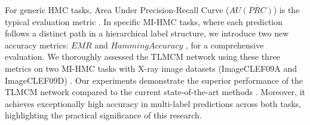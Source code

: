 \documentclass[wcp]{jmlr}
\begin{document}

For generic HMC tasks, Area Under Precision-Recall Curve ($AU\overline{(PRC)}$) is the typical evaluation metric \cite{Giunchiglia01,Wehrmann01}. In specific MI-HMC tasks, where each prediction follows a distinct path in a hierarchical label structure, we introduce two new accuracy metrics: $EMR$ and $HammingAccuracy$ \cite{Sorower01}, for a comprehensive evaluation. We thoroughly assessed the TLMCM network using these three metrics on two MI-HMC tasks with X-ray image datasets (ImageCLEF09A and ImageCLEF09D) \cite{clef}. Our experiments demonstrate the superior performance of the TLMCM network compared to the current state-of-the-art methods \cite{Giunchiglia01}. Moreover, it achieves exceptionally high accuracy in multi-label predictions across both tasks, highlighting the practical significance of this research.

\end{document}
